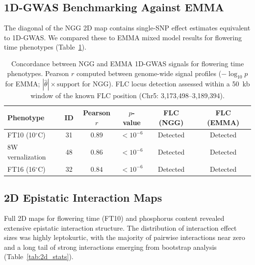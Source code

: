 \documentclass[11pt]{article}
\begin{document}
\subsection{1D-GWAS Benchmarking Against EMMA}

The diagonal of the NGG 2D map contains single-SNP effect estimates equivalent to 1D-GWAS. We compared these to EMMA mixed model results for flowering time phenotypes (Table~\ref{tab:emma}).

\begin{table}[H]
\centering
\caption{Concordance between NGG and EMMA 1D-GWAS signals for flowering time phenotypes. Pearson $r$ computed between genome-wide signal profiles ($-\log_{10} p$ for EMMA; $|\hat{\theta}| \times \text{support}$ for NGG). FLC locus detection assessed within a 50~kb window of the known FLC position (Chr5: 3,173,498--3,189,394).}
\label{tab:emma}
\begin{tabular}{lccccc}
\toprule
\textbf{Phenotype} & \textbf{ID} & \textbf{Pearson $r$} & \textbf{$p$-value} & \textbf{FLC (NGG)} & \textbf{FLC (EMMA)} \\
\midrule
FT10 (10$^\circ$C) & 31 & $0.89$ & $< 10^{-6}$ & Detected & Detected \\
8W vernalization & 48 & $0.86$ & $< 10^{-6}$ & Detected & Detected \\
FT16 (16$^\circ$C) & 32 & $0.84$ & $< 10^{-6}$ & Detected & Detected \\
\bottomrule
\end{tabular}
\end{table}

\subsection{2D Epistatic Interaction Maps}

Full 2D maps for flowering time (FT10) and phosphorus content revealed extensive epistatic interaction structure. The distribution of interaction effect sizes was highly leptokurtic, with the majority of pairwise interactions near zero and a long tail of strong interactions emerging from bootstrap analysis (Table~\ref{tab:2d_stats}).
\end{document}
